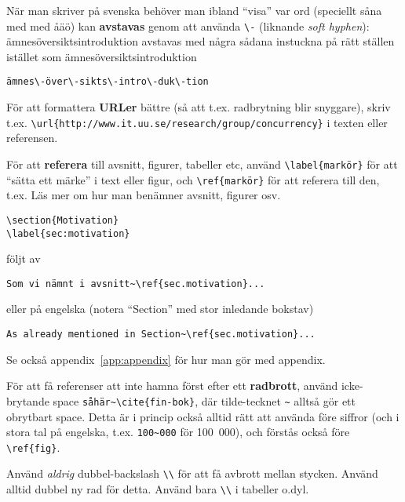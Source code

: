 När man skriver på svenska behöver man ibland ``visa'' var ord (speciellt såna med med åäö) kan \textbf{avstavas} genom att använda \verb|\-| (liknande \textit{soft hyphen}): ämnesöversiktsintroduktion avstavas med några sådana instuckna på rätt ställen istället som ämnes\-över\-sikts\-intro\-duk\-tion

\begin{verbatim}
ämnes\-över\-sikts\-intro\-duk\-tion
\end{verbatim}

För att formattera \textbf{URLer} bättre (så att t.ex. radbrytning blir snyggare), skriv t.ex. \verb|\url{http://www.it.uu.se/research/group/concurrency}| i texten eller referensen.

\label{sec:referera-labels}
För att \textbf{referera} till avsnitt, figurer, tabeller etc, använd \verb|\label{markör}| för att ``sätta ett märke'' i text eller figur, och \verb|\ref{markör}| för att referera till den, t.ex. Läs mer  om hur man benämner avsnitt, figurer osv.
\begin{verbatim}
\section{Motivation}
\label{sec:motivation}
\end{verbatim}

följt av
\begin{verbatim}
Som vi nämnt i avsnitt~\ref{sec.motivation}...
\end{verbatim}
eller på engelska (notera ``Section'' med stor inledande bokstav)
\begin{verbatim}
As already mentioned in Section~\ref{sec.motivation}...
\end{verbatim}
Se också appendix~\ref{app:appendix} för hur man gör med appendix.


För att få referenser att inte hamna först efter ett \textbf{radbrott}, använd icke-brytande space \verb|såhär~\cite{fin-bok}|, där tilde-tecknet \verb|~| alltså gör ett obrytbart space. Detta är i princip också alltid rätt att använda före siffror (och i stora tal på engelska, t.ex. \verb|100~000| för 100~000), och förstås också före \verb|\ref{fig}|.

Använd \emph{aldrig} dubbel-backslash \verb|\\| för att få avbrott mellan stycken. Använd alltid dubbel ny rad för detta. Använd bara \verb|\\| i tabeller o.dyl.


